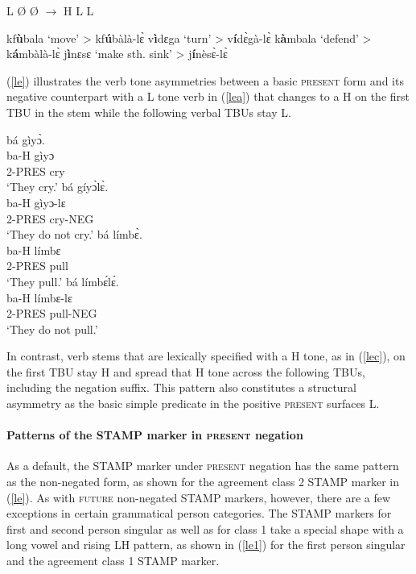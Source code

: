\begin{exe}
\ex\label{leLLL} L {\O} {\O} $\rightarrow$ H L L
\begin{xlist}
\ex kf{\bfseries ù}bala `move' > kf{\bfseries ú}bàlà-lɛ̀
\ex  v{\bfseries ì}dɛga  `turn' > v{\bfseries í}dɛ̀gà-lɛ̀
\ex k{\bfseries à}mbala `defend' > k{\bfseries á}mbàlà-lɛ̀
\ex j{\bfseries ì}nɛsɛ `make sth. sink' >  j{\bfseries í}nèsɛ̀-lɛ̀
\end{xlist}
\end{exe}

(\ref{le}) illustrates the verb tone asymmetries between a basic \textsc{present} form and its negative counterpart with a L tone verb in (\ref{lea}) that changes to a H on the first TBU in the stem while the following verbal TBUs stay L. 

\begin{exe}
\ex\label{le}
\begin{multicols}{2}
\begin{xlist}
\ex \label{lea} \glll  bá gìyɔ̀. \\
          ba-H gìyɔ \\
           2-PRES cry   \\
    \trans `They cry.'
\ex \label{leb} 
\glll  bá gíyɔ̀lɛ̀. \\
          ba-H gìyɔ-lɛ \\
           2-PRES cry-NEG   \\
    \trans `They do not cry.'
\ex \label{lec} \glll  bá límbɛ̀. \\
          ba-H límbɛ \\
           2-PRES pull   \\
    \trans `They pull.'
\ex  \label{led}
\glll  bá límbɛ́lɛ́. \\
          ba-H límbɛ-lɛ \\
           2-PRES pull-NEG   \\
    \trans `They do not pull.'
\end{xlist}
\end{multicols}
\end{exe}

\noindent In contrast, verb stems that are lexically specified with a H tone, as in (\ref{lec}), on the first TBU stay H and spread that H tone across the following TBUs, including the negation suffix. This pattern also constitutes a structural asymmetry as the basic simple predicate in the positive \textsc{present} surfaces L.
 


\paragraph{Patterns of the STAMP marker in \textsc{present} negation}
As a default, the STAMP marker under \textsc{present} negation has the same pattern as the non-negated form, as shown for the agreement class 2 STAMP marker in (\ref{le}). As with \textsc{future} non-negated STAMP markers, however, there are a few exceptions in certain grammatical person categories. The STAMP markers for first and second person singular as well as for class 1 take a special shape with a long vowel and rising LH pattern, as shown in (\ref{le1}) for the first person singular and the agreement class 1 STAMP marker.

